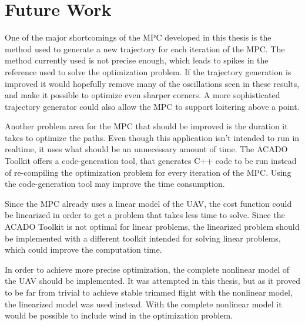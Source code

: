 
\section{Future Work}

One of the major shortcomings of the MPC developed in this thesis is the method used to generate a new trajectory for each iteration of the MPC. The method currently used is not precise enough, which leads to spikes in the reference used to solve the optimization problem. If the trajectory generation is improved it would hopefully remove many of the oscillations seen in these results, and make it possible to optimize even sharper corners. A more sophisticated trajectory generator could also allow the MPC to support loitering above a point.

Another problem area for the MPC that should be improved is the duration it takes to optimize the paths. Even though this application isn't intended to run in realtime, it uses what should be an unnecessary amount of time. The ACADO Toolkit offers a code-generation tool, that generates C++ code to be run instead of re-compiling the optimization problem for every iteration of the MPC. Using the code-generation tool may improve the time consumption.

Since the MPC already uses a linear model of the UAV, the cost function could be linearized in order to get a problem that takes less time to solve. Since the ACADO Toolkit is not optimal for linear problems, the linearized problem should be implemented with a different toolkit intended for solving linear problems, which could improve the computation time.

In order to achieve more precise optimization, the complete nonlinear model of the UAV should be implemented. It was attempted in this thesis, but as it proved to be far from trivial to achieve stable trimmed flight with the nonlinear model, the linearized model was used instead. With the complete nonlinear model it would be possible to include wind in the optimization problem.
